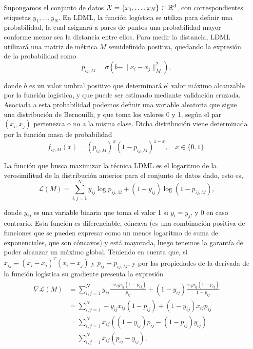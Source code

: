 Supongamos el conjunto de datos $\mathcal{X} = \{x_1,\dots,x_N\} \subset \mathbb{R}^d$, con correspondientes etiquetas $y_1,\dots,y_N$. En LDML, la función logística se utiliza para definir una probabilidad, la cual asignará a pares de puntos una probabilidad mayor conforme menor sea la distancia entre ellos. Para medir la distancia, LDML utilizará una matriz de métrica $M$ semidefinida positiva, quedando la expresión de la probabilidad como
\begin{equation}
    p_{ij,M} = \sigma(b - \|x_i-x_j\|_M^2),
\end{equation} 

donde $b$ es un valor umbral positivo que determinará el valor máximo alcanzable por la función logística, y que puede ser estimado mediante validación cruzada. Asociada a esta probabilidad podemos definir una variable aleatoria que sigue una distribución de Bernouilli, y que toma los valores 0 y 1, según el par $(x_i,x_j)$ pertenezca o no a la misma clase. Dicha distribución viene determinada por la función masa de probabilidad
\[ f_{ij,M}(x) = (p_{ij,M})^{x}(1-p_{ij,M})^{1-x}, \quad x  \in \{0,1\}. \]

La función que busca maximizar la técnica LDML es el logaritmo de la verosimilitud de la distribución anterior para el conjunto de datos dado, esto es,
\begin{equation}
    \mathcal{L}(M) = \sum_{i,j=1}^N y_{ij}\log p_{ij,M} + (1-y_{ij})\log(1-p_{ij,M}),
\end{equation}

donde $y_{ij}$ es una variable binaria que toma el valor 1 si $y_i = y_j$, y 0 en caso contrario. Esta función es diferenciable, cóncava (es una combinación positiva de funciones que se pueden expresar como un menos logaritmo de suma de exponenciales, que son cóncavos) y está mayorada, luego tenemos la garantía de poder alcanzar un máximo global. Teniendo en cuenta que, si $x_{ij} \equiv (x_i-x_j)^T(x_i-x_j)$ y $p_{ij} \equiv p_{ij,M}$, y por las propiedades de la derivada de la función logística su gradiente presenta la expresión
\begin{align*}
    \mathcal{\nabla L}(M) &= \sum_{i,j=1}^N y_{ij}\frac{-x_{ij} p_{ij}(1 - p_{ij})}{p_{ij}} + (1-y_{ij})\frac{x_{ij}p_{ij}(1-p_{ij})}{1-p_{ij}} \\
                          &= \sum_{i,j=1}^N -y_{ij}x_{ij}(1 - p_{ij}) + (1-y_{ij})x_{ij}p_{ij} \\
                          &= \sum_{i,j=1}^N x_{ij}((1-y_{ij})p_{ij}-(1-p_{ij})y_{ij}) \\
                          &= \sum_{i,j=1}^N x_{ij}(p_{ij}-y_{ij}),
\end{align*}

